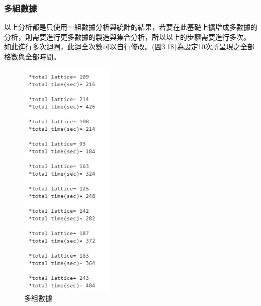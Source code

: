 \subsubsection{多組數據}
\vspace*{-4mm}
以上分析都是只使用一組數據分析與統計的結果，若要在此基礎上擴增成多數據的分析，則需要進行更多數據的製造與集合分析，所以以上的步驟需要進行多次。
如此進行多次迴圈，此迴全次數可以自行修改。(圖3.18)為設定10次所呈現之全部格數與全部時間。
\begin{figure}[H] 
	\centering 
	\includegraphics[width=0.4\textwidth]{3_17.png} 
	\caption{多組數據} 
	\label{Fig.3.18} 
\end{figure}

